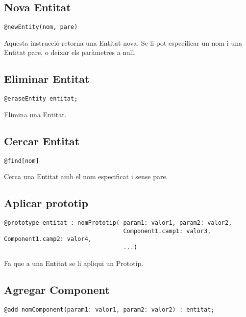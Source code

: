\subsection{Nova Entitat}

\begin{verbatim}
@newEntity(nom, pare)
\end{verbatim}

Aquesta instrucció retorna una Entitat nova. Se li pot especificar un nom i una Entitat pare, o deixar els paràmetres a null.

\subsection{Eliminar Entitat}

\begin{verbatim}
@eraseEntity entitat;
\end{verbatim}

Elimina una Entitat.

\subsection{Cercar Entitat}

\begin{verbatim}
@find[nom]
\end{verbatim}

Cerca una Entitat amb el nom especificat i sense pare.

\subsection{Aplicar prototip}

\begin{verbatim}
@prototype entitat : nomPrototip( param1: valor1, param2: valor2, 
                                  Component1.camp1: valor3, Component1.camp2: valor4,
                                  ...)
\end{verbatim}

Fa que a una Entitat se li apliqui un Prototip.

\subsection{Agregar Component}

\begin{verbatim}
@add nomComponent(param1: valor1, param2: valor2) : entitat;
\end{verbatim}

